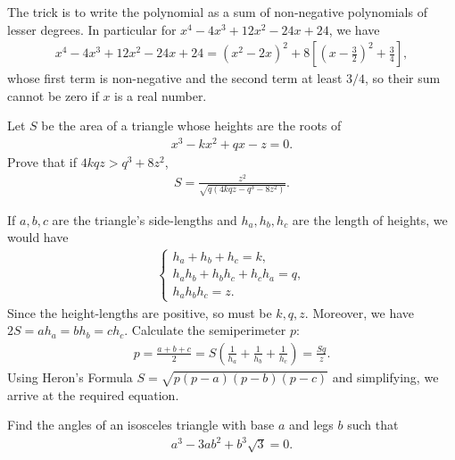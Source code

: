 \begin{solution}
    The trick is to write the polynomial as a sum of non-negative polynomials of lesser degrees. In particular for $x^4-4x^3+12x^2-24x+24$, we have
    \begin{align*}
        x^4-4x^3+12x^2-24x+24 = (x^2-2x)^2 + 8\left[\left(x-\frac{3}{2}\right)^2+\frac{3}{4}\right],
    \end{align*}
    whose first term is non-negative and the second term at least $3/4$, so their sum cannot be zero if $x$ is a real number.
\end{solution}


\begin{question}
    Let $S$ be the area of a triangle whose heights are the roots of
    \begin{align*}
        x^3-kx^2+qx-z=0.
    \end{align*}
    Prove that if $4kqz > q^3 + 8z^2$,
    \begin{align*}
        S=\frac{z^2}{\sqrt{q(4kqz-q^3-8z^2)}}.
    \end{align*}
\end{question}


\begin{solution}
    If $a,b,c$ are the triangle's side-lengths and $h_a,h_b,h_c$ are the length of heights, we would have
    \begin{align*}
        \begin{cases}
            h_a + h_b + h_c = k,\\
            h_ah_b + h_bh_c + h_ch_a = q,\\
            h_ah_bh_c = z.
        \end{cases}
    \end{align*}
    Since the height-lengths are positive, so must be $k,q,z$. Moreover, we have $2S = ah_a=bh_b=ch_c$. Calculate the semiperimeter $p$:
    \begin{align*}
        p = \frac{a+b+c}{2} = S\left(\frac{1}{h_a}+\frac{1}{h_b}+\frac{1}{h_c}\right) = \frac{Sq}{z}.
    \end{align*}
    Using Heron's Formula $S=\sqrt{p(p-a)(p-b)(p-c)}$ and simplifying, we arrive at the required equation.
\end{solution}


\begin{question}
    Find the angles of an isosceles triangle with base $a$ and legs $b$ such that
    \begin{align*}
        a^3-3ab^2+b^3\sqrt{3}=0.
    \end{align*}
\end{question}

